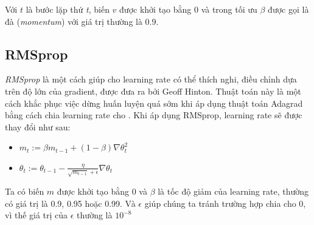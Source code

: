 Với $t$ là bước lặp thứ \textit{t}, biến $v$ được khởi tạo bằng 0 và trong tối ưu $\beta$ được gọi là đà (\textit{momentum}) với giá trị thường là $0.9$.
%
%

\subsection{RMSprop}
\textit{RMSprop} là một cách giúp cho learning rate có thể thích nghi, điều chỉnh dựa trên độ lớn của gradient, được đưa ra bởi Geoff Hinton. Thuật toán này là một cách khắc phục việc dừng huấn luyện quá sớm khi áp dụng thuật toán Adagrad bằng cách chia learning rate cho . Khi áp dụng RMSprop, learning rate sẽ được thay đổi như sau:
\begin{itemize}
\item[] $m_t := \beta m_{t-1} + (1-\beta) \nabla\theta_{t}^2  $
\item[] $\theta_t := \theta_{t-1} - \frac{\eta}{\sqrt{m_{t-1}}+\epsilon}\nabla\theta_{t}$
\end{itemize}
Ta có biến $m$ được khởi tạo bằng 0 và $\beta$ là tốc độ giảm của learning rate, thường có giá trị là 0.9, 0.95 hoặc 0.99. Và $\epsilon$ giúp chúng ta tránh trường hợp chia cho 0, vì thế giá trị của $\epsilon$ thường là $10^{-8}$ 
